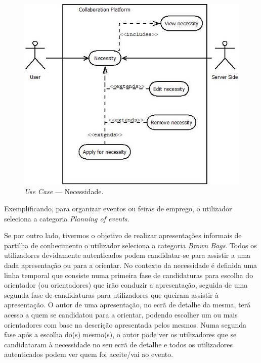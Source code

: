\begin{figure}[H]
    \centering
    \includegraphics[scale=0.6]{figures/Necessity.jpeg}
    \caption{\textit{Use Case} --- Necessidade.}\label{fig:uc:necessity}
\end{figure}

Exemplificando, para organizar eventos ou feiras de emprego, o utilizador seleciona a categoria \textit{Planning of events}.

Se por outro lado, tivermos o objetivo de realizar apresentações informais de partilha de conhecimento o utilizador seleciona a categoria \textit{Brown Bags}. 
Todos os utilizadores devidamente autenticados podem candidatar-se para assistir a uma dada apresentação ou para a orientar. 
No contexto da necessidade é definida uma linha temporal que consiste numa primeira fase de candidaturas para escolha do orientador 
(ou orientadores) que irão conduzir a apresentação, seguida de uma segunda fase de candidaturas para utilizadores que queiram assistir à apresentação. 
O autor de uma apresentação, no ecrã de detalhe da mesma, terá acesso a quem se candidatou para a orientar, podendo escolher um ou mais orientadores 
com base na descrição apresentada pelos mesmos. 
Numa segunda fase após a escolha do(s) mesmo(s), o autor pode ver os utilizadores que se 
candidataram à necessidade no seu ecrã de detalhe e todos os utilizadores autenticados podem ver quem foi aceite/vai ao evento.

